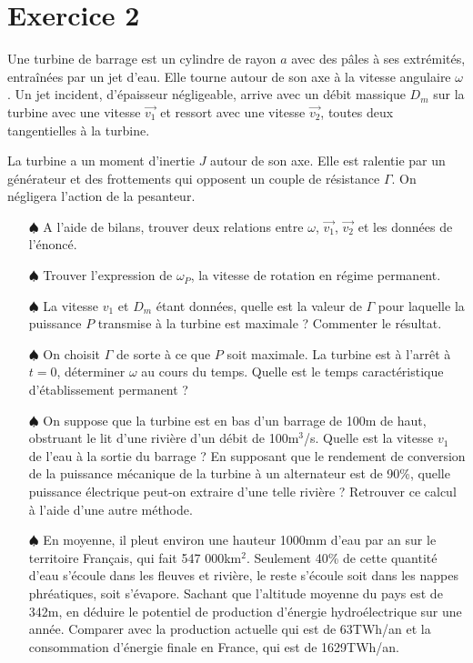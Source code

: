 \documentclass{report}
\begin{document}
\newpage

\section*{Exercice 2}

Une turbine de barrage est un cylindre de rayon $a$ avec des pâles à ses extrémités, entraînées par un jet d'eau. Elle tourne autour de son axe à la vitesse angulaire $\omega$. Un jet incident, d'épaisseur négligeable, arrive avec un débit massique $D_m$ sur la turbine avec une vitesse $\vec{v_1}$ et ressort avec une vitesse $\vec{v_2}$, toutes deux tangentielles à la turbine.

La turbine a un moment d'inertie $J$ autour de son axe. Elle est ralentie par un générateur et des frottements qui opposent un couple de résistance $\Gamma$. On négligera l'action de la pesanteur.

\begin{itemize}

	\item[$\spadesuit$] A l'aide de bilans, trouver deux relations entre $\omega$,  $\vec{v_1}$,  $\vec{v_2}$ et les données de l'énoncé.
	
	\item[$\spadesuit$] Trouver l'expression de $\omega_P$, la vitesse de rotation en régime permanent. 
	
	\item[$\spadesuit$] La vitesse $v_1$ et $D_m$ étant données, quelle est la valeur de $\Gamma$ pour laquelle la puissance $P$ transmise à la turbine est maximale ? Commenter le résultat.
	
	\item[$\spadesuit$] On choisit $\Gamma$ de sorte à ce que $P$ soit maximale. La turbine est à l'arrêt à $t=0$, déterminer $\omega$ au cours du temps. Quelle est le temps caractéristique d'établissement permanent ?
	
	\item[$\spadesuit$] On suppose que la turbine est en bas d'un barrage de 100m de haut, obstruant le lit d'une rivière d'un débit de 100m$^3$/s. Quelle est la vitesse $v_1$ de l'eau à la sortie du barrage ? En supposant que le rendement de conversion de la puissance mécanique de la turbine à un alternateur est de 90\%, quelle puissance électrique peut-on extraire d'une telle rivière ? Retrouver ce calcul à l'aide d'une autre méthode.
	
	\item[$\spadesuit$] En moyenne, il pleut environ une hauteur 1000mm d'eau par an sur le territoire Français, qui fait 547 000km$^2$. Seulement 40\% de cette quantité d'eau s'écoule dans les fleuves et rivière, le reste s'écoule soit dans les nappes phréatiques, soit s'évapore. Sachant que l'altitude moyenne du pays est de 342m, en déduire le potentiel de production d'énergie hydroélectrique sur une année. Comparer avec la production actuelle qui est de 63TWh/an et la consommation d'énergie finale en France, qui est de 1629TWh/an.

\end{itemize}
\end{document}
